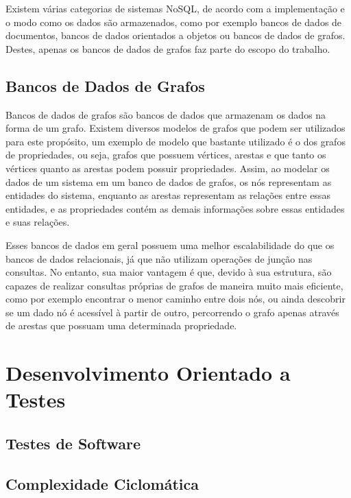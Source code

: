 Existem várias categorias de sistemas NoSQL, de acordo com a implementação e o modo como os dados são armazenados, como por exemplo bancos de dados de documentos, bancos de dados orientados a objetos ou bancos de dados de grafos.
Destes, apenas os bancos de dados de grafos faz parte do escopo do trabalho.

\subsection{Bancos de Dados de Grafos}


Bancos de dados de grafos são bancos de dados que armazenam os dados na forma de um grafo. Existem diversos modelos de grafos que podem ser utilizados para este propósito, um exemplo de modelo que bastante utilizado é o dos grafos de propriedades, ou seja, grafos que possuem vértices, arestas e que tanto os vértices quanto as arestas podem possuir propriedades.
Assim, ao modelar os dados de um sistema em um banco de dados de grafos, os nós representam as entidades do sistema, enquanto as arestas representam as relações entre essas entidades, e as propriedades contém as demais informações sobre essas entidades e suas relações.


Esses bancos de dados em geral possuem uma melhor escalabilidade do que os bancos de dados relacionais, já que não utilizam operações de junção nas consultas.
No entanto, sua maior vantagem é que, devido à sua estrutura, são capazes de realizar consultas próprias de grafos de maneira muito mais eficiente, como por exemplo encontrar o menor caminho entre dois nós, ou ainda descobrir se um dado nó é acessível à partir de outro, percorrendo o grafo apenas através de arestas que possuam uma determinada propriedade.


\section{Desenvolvimento Orientado a Testes}

\subsection{Testes de Software}

\subsection{Complexidade Ciclomática}


